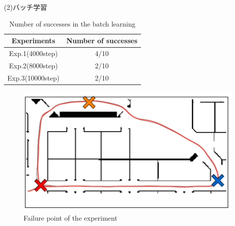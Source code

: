 
\newpage
\begin{description}
  \item [(2)バッチ学習]
\end{description}

\begin{table}[h]
  \centering
  \begin{tabular}{|c|c|} \hline
    Experiments & Number of successes \\ \hline
    Exp.1(4000step) & 4/10 \\ \hline
    Exp.2(8000step) & 2/10 \\ \hline
    Exp.3(10000step) & 2/10 \\ \hline
  \end{tabular}
  \caption{Number of successes in the batch learning}
  \label{tb:exp1.2}
\end{table}

\begin{figure}[h]
  \centering
  \includegraphics[keepaspectratio, scale=0.5]{images/result1.2.png}
  \caption{Failure point of the experiment}
  \label{Fig:result1.2}
  \end{figure}

